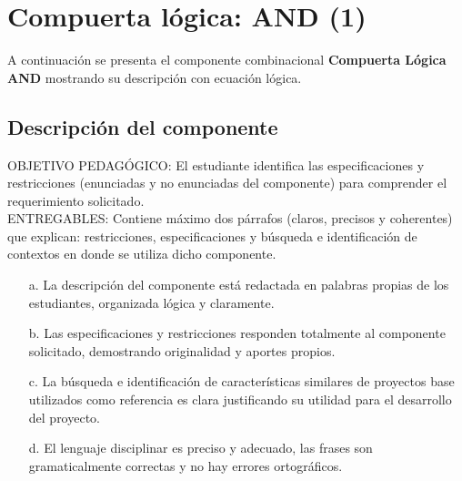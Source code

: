 \newcommand{\verilogfolderGateAND}{./componentes}
\newcommand{\imagesfolderGateAND}{./componentes}

\section{Compuerta lógica: AND (1)}
\normalsize
A continuación se presenta el componente combinacional \textbf{Compuerta Lógica AND} mostrando su descripción con ecuación lógica.
\subsection{Descripción del componente}
\scriptsize
	\begin{tcolorbox}[enhanced,title=PRODUCTO DE CALIDAD:,colframe=colorA1,colback=colorA2,arc=0mm,colbacktitle=white,fonttitle=\bfseries,coltitle=white,attach boxed title to top left={xshift=3.2mm,yshift=-0.50mm},boxed title style={skin=enhancedfirst jigsaw,size=small,arc=0mm,bottom=1mm,interior style={fill=none,top color=color2,bottom color=color2},,boxrule=0pt},boxrule=0pt]
	OBJETIVO PEDAGÓGICO: El estudiante identifica las especificaciones y restricciones (enunciadas y no enunciadas del componente) para comprender el requerimiento solicitado. \\
	ENTREGABLES: Contiene máximo dos párrafos (claros, precisos y coherentes) que explican: restricciones, especificaciones y búsqueda e identificación de contextos en donde se utiliza dicho componente.
		\begin{enumerate}
			\item[a.] La descripción del componente está redactada en palabras propias de los estudiantes, organizada lógica y claramente. 
			\item[b.] Las especificaciones y restricciones responden totalmente al componente solicitado, demostrando originalidad y aportes propios.
			\item[c.] La búsqueda e identificación de características similares de proyectos base utilizados como referencia es clara justificando su utilidad para el desarrollo del proyecto.
			\item[d.] El lenguaje disciplinar es preciso y adecuado, las frases son gramaticalmente correctas y no hay errores ortográficos. 	
		\end{enumerate}
	\end{tcolorbox}

